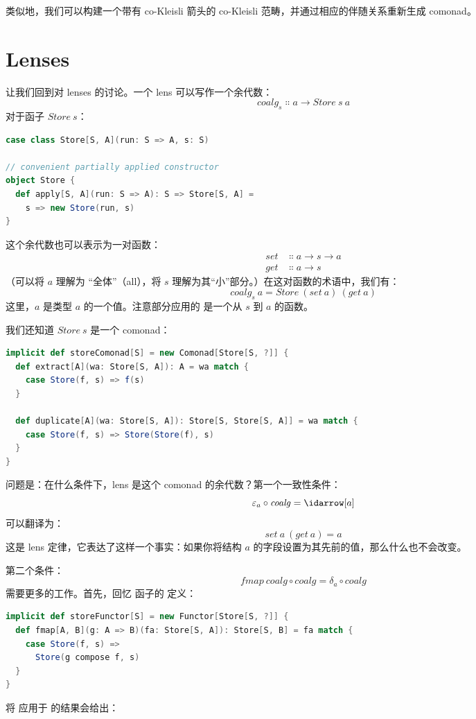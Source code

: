 类似地，我们可以构建一个带有 co-Kleisli 箭头的 co-Kleisli 范畴，并通过相应的伴随关系重新生成 comonad。

\section{Lenses}

让我们回到对 lenses 的讨论。一个 lens 可以写作一个余代数：
\[\mathit{coalg}_s \Colon a \to \mathit{Store}\ s\ a\]
对于函子 $\mathit{Store}\ s$：

\begin{lstlisting}[language=Scala]
case class Store[S, A](run: S => A, s: S)

// convenient partially applied constructor
object Store {
  def apply[S, A](run: S => A): S => Store[S, A] =
    s => new Store(run, s)
}
\end{lstlisting}
这个余代数也可以表示为一对函数：
\begin{align*}
  \mathit{set} & \Colon a \to s \to a \\
  \mathit{get} & \Colon a \to s
\end{align*}
（可以将 $a$ 理解为 “全体”（all），将 $s$ 理解为其“小”部分。）在这对函数的术语中，我们有：
\[\mathit{coalg}_s\ a = \mathit{Store}\ (\mathit{set}\ a)\ (\mathit{get}\ a)\]
这里，$a$ 是类型 $a$ 的一个值。注意部分应用的  是一个从 $s$ 到 $a$ 的函数。

我们还知道 $\mathit{Store}\ s$ 是一个 comonad：

\begin{lstlisting}[language=Scala]
implicit def storeComonad[S] = new Comonad[Store[S, ?]] {
  def extract[A](wa: Store[S, A]): A = wa match {
    case Store(f, s) => f(s)
  }
  
  def duplicate[A](wa: Store[S, A]): Store[S, Store[S, A]] = wa match {
    case Store(f, s) => Store(Store(f), s)
  }
}
\end{lstlisting}
问题是：在什么条件下，lens 是这个 comonad 的余代数？第一个一致性条件：
\[\varepsilon_a \circ \mathit{coalg} = \idarrow[a]\]
可以翻译为：
\[\mathit{set}\ a\ (\mathit{get}\ a) = a\]
这是 lens 定律，它表达了这样一个事实：如果你将结构 $a$ 的字段设置为其先前的值，那么什么也不会改变。

第二个条件：
\[\mathit{fmap}\ \mathit{coalg} \circ \mathit{coalg} = \delta_a \circ \mathit{coalg}\]
需要更多的工作。首先，回忆  函子的  定义：

\begin{lstlisting}[language=Scala]
implicit def storeFunctor[S] = new Functor[Store[S, ?]] {
  def fmap[A, B](g: A => B)(fa: Store[S, A]): Store[S, B] = fa match {
    case Store(f, s) =>
      Store(g compose f, s)
  }
}
\end{lstlisting}
将  应用于  的结果会给出：

